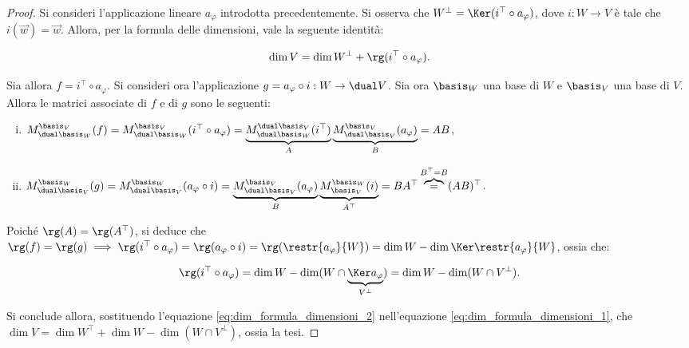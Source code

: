 \begin{proof}
	Si consideri l'applicazione lineare $a_\varphi$ introdotta precedentemente. Si osserva che $W^\perp = \Ker (i^\top \circ a_\varphi)$, dove $i : W \to V$ è tale che $i(\vec w) = \vec w$. Allora,
	per la formula delle dimensioni, vale la seguente identità: 
	
	\begin{equation}
		\label{eq:dim_formula_dimensioni_1}
		\dim V = \dim W^\perp + \rg (i^\top \circ a_\varphi). 
	\end{equation}
	
	\vskip 0.05in
	
	Sia allora $f = i^\top \circ a_\varphi$.
	Si consideri ora l'applicazione $g = a_\varphi \circ i : W \to \dual V$. Sia ora $\basis_W$ una base di $W$ e
	$\basis_V$ una base di $V$. Allora le matrici associate di $f$ e di $g$ sono le seguenti:
	
	\begin{enumerate}[(i)]
		\item $M_{\dual \basis_W}^{\basis_V}(f) = M_{\dual \basis_W}^{\basis_V}(i^\top \circ a_\varphi) =
		\underbrace{M_{\dual \basis_W}^{\dual \basis_V}(i^\top)}_A \underbrace{M_{\dual \basis_V}^{\basis_V}(a_\varphi)}_B = AB$,
		\item $M_{\dual \basis_V}^{\basis_W}(g) = M_{\dual \basis_V}^{\basis_W}(a_\varphi \circ i) =
		\underbrace{M_{\dual \basis_V}^{\basis_V}(a_\varphi)}_B \underbrace{M_{\basis_V}^{\basis_W}(i)}_{A^\top} = BA^\top \overbrace{=}^{B^\top = B} (AB)^\top$.
	\end{enumerate}
	
	Poiché $\rg(A) = \rg(A^\top)$, si deduce che $\rg(f) = \rg(g) \implies \rg(i^\top \circ a_\varphi) = \rg(a_\varphi \circ i) = \rg(\restr{a_\varphi}{W}) = \dim W - \dim \Ker \restr{a_\varphi}{W}$, ossia che:
	
	\begin{equation}
		\label{eq:dim_formula_dimensioni_2}
		\rg(i^\top \circ a_\varphi) = \dim W - \dim (W \cap \underbrace{\Ker a_\varphi}_{V^\perp}) = \dim W - \dim (W \cap V^\perp).
	\end{equation}
	
	Si conclude allora, sostituendo l'equazione \eqref{eq:dim_formula_dimensioni_2} nell'equazione \eqref{eq:dim_formula_dimensioni_1}, che $\dim V = \dim W^\top + \dim W - \dim (W \cap V^\perp)$, ossia la tesi.
\end{proof}

